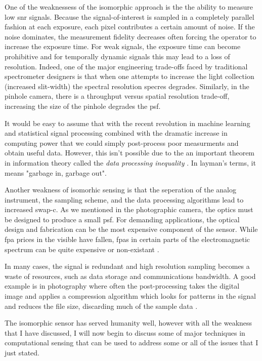 One of the weaknessess of the isomorphic approach is the the ability to measure low \gls{snr} signals. Because the signal-of-interest is sampled in a completely parallel fashion at each exposure, each pixel contributes a certain amount of noise. If the noise dominates, the measurement fidelity decreases often forcing the operator to increase the exposure time. For weak signals, the exposure time can become prohibitive and for temporally dynamic signals this may lead to a loss of resolution. Indeed, one of the major engineering trade-offs faced by traditional spectrometer designers is that when one attempts to increase the light collection (increased slit-width) the spectral resolution \gls{specres} degrades. Similarly, in the pinhole camera, there is a throughput versus spatial resolution trade-off, increasing the size of the pinhole degrades the \gls{psf}.

It would be easy to assume that with the recent revolution in machine learning and statistical signal processing combined with the dramatic increase in computing power that we could simply post-process poor measurments and obtain useful data. However, this isn't possible due to the an important theorem in information theory called the \emph{data processing inequality} \cite{cover2012elements}. In layman's terms, it means "garbage in, garbage out".

Another weakness of isomorhic sensing is that the seperation of the analog instrument, the sampling scheme, and the data processing algorithms lead to increased \gls{swap-c}. As we mentioned in the photographic camera, the optics must be designed to produce a small \gls{psf}. For demanding applications, the optical design and fabrication can be the most expensive component of the sensor. While \gls{fpa} prices in the visible have fallen, \glspl{fpa} in certain parts of the electromagnetic spectrum can be quite expensive or non-existant \cite{watts2014terahertz, noor2011compressive}.

In many cases, the signal is redundant and high resolution sampling becomes a waste of resources, such as data storage and communications bandwidth. A good example is in photography where often the post-processing takes the digital image and applies a compression algorithm which looks for patterns in the signal and reduces the file size, discarding much of the sample data \cite{taubman2012jpeg2000}. 

The isomorphic sensor has served humanity well, however with all the weakness that I have discussed, I will now begin to discuss some of major techniques in computational sensing that can be used to address some or all of the issues that I just stated. 

